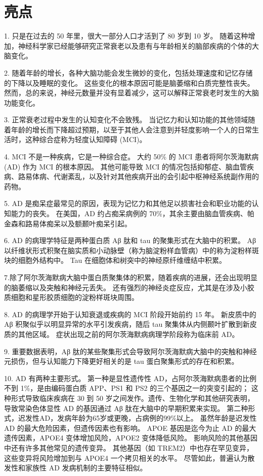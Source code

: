 \section{亮点}
1. 只是在过去的 50 年里，很大一部分人口才活到了 80 岁到 10 岁。 随着这种增加，神经科学家已经能够研究正常衰老以及患有与年龄相关的脑部疾病的个体的大脑变化。 

2. 随着年龄的增长，各种大脑功能会发生微妙的变化，包括处理速度和记忆存储的下降以及睡眠的变化。 这些变化的根本原因可能是脑萎缩和白质完整性丧失。 然而，总的来说，神经元数量并没有显着减少，这可以解释正常衰老时发生的大脑功能变化。 

3. 正常衰老过程中发生的认知变化不会致残。 当记忆力和认知功能的其他领域随着年龄的增长而下降超过预期，以至于其他人会注意到并轻度影响一个人的日常生活时，这种综合症称为轻度认知障碍 (MCI)。 

4. MCI 不是一种疾病，它是一种综合症。 大约 50\% 的 MCI 患者将阿尔茨海默病 (AD) 作为 MCI 的根本原因。 其他可能导致 MCI 的情况包括抑郁症、脑血管疾病、路易体病、代谢紊乱，以及针对其他疾病开出的会引起中枢神经系统副作用的药物。 

5. AD 是痴呆症最常见的原因，表现为记忆力和其他足以损害社会和职业功能的认知能力的丧失。 在美国，AD 约占痴呆病例的 70\%，其余主要由脑血管疾病、帕金森和路易体痴呆以及额颞叶痴呆引起。 

6. AD 的病理学特征是两种蛋白质 Aβ 肽和 tau 的聚集形式在大脑中的积累。 Aβ 以纤维状形式积聚在脑实质和小动脉壁（称为脑淀粉样血管病）中的称为淀粉样斑块的细胞外结构中。 Tau 在细胞体和树突中的神经原纤维缠结中积累。 

7.除了阿尔茨海默病大脑中蛋白质聚集体的积累，随着疾病的进展，还会出现明显的脑萎缩以及突触和神经元丢失。 还有强烈的神经炎症反应，尤其是在涉及小胶质细胞和星形胶质细胞的淀粉样斑块周围。 

8. AD 的病理学开始于认知衰退或疾病的 MCI 阶段开始前约 15 年。 新皮质中的 Aβ 积聚似乎以明显异常的水平引发疾病，随后 tau 聚集体从内侧颞叶扩散到新皮质的其他区域。 症状出现之前的阿尔茨海默病病理学阶段称为临床前 AD。 

9. 重要数据表明，Aβ 肽的某些聚集形式会导致阿尔茨海默病大脑中的突触和神经元损伤，但与认知能力下降更好相关的是 tau 蛋白聚集形式的存在和积累。 

10. AD 有两种主要形式。 第一种是显性遗传性 AD，占阿尔茨海默病患者的比例不到 1\%，是由编码蛋白质 APP、PS1 和 PS2 的三个基因之一的突变引起的； 这种形式导致临床疾病在 30 到 50 岁之间发作。遗传、生物化学和其他研究表明，导致常染色体显性 AD 的基因通过 Aβ 肽在大脑中的早期积累来实现。 第二种形式，迟发性AD，发病年龄为65岁或更晚，占病例的99\%以上。 虽然年龄是迟发性 AD 的最大危险因素，但遗传因素也有影响。 APOE 基因是迄今为止 AD 的最大遗传因素，APOE4 变体增加风险，APOE2 变体降低风险。 影响风险的其他基因中还有许多其他常见的遗传变异。 其他基因（如 TREM2）中也存在罕见变异，这些变异将风险增加到与 APOE4 一个拷贝相关的水平。 尽管如此，普遍认为散发性和家族性 AD 发病机制的主要特征相似。 

